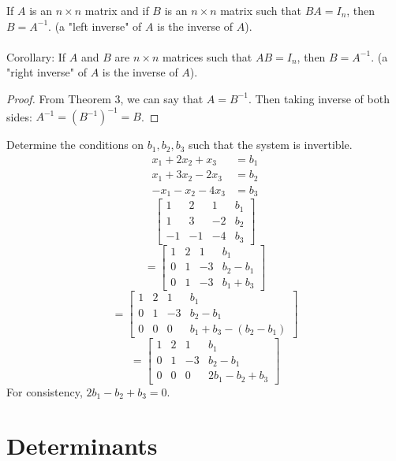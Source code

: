 \documentclass[12pt]{article}
\begin{document}
  \begin{theorem} If $A$ is an $n \times n$ matrix and if $B$ is an $n \times n$ matrix such that $BA = I_n$, then $B = A^{-1}$. (a "left inverse" of $A$ is the inverse of $A$). \\~\\ Corollary: If $A$ and $B$ are $n \times n$ matrices such that $AB = I_n$, then $B = A^{-1}$. (a "right inverse" of $A$ is the inverse of $A$). \end{theorem}
  \begin{proof} From Theorem 3, we can say that $A = B^{-1}$. Then taking inverse of both sides: $A^{-1} = (B^{-1})^{-1} = B$. \end{proof} 
  \begin{example} Determine the conditions on $b_1, b_2, b_3$ such that the system is invertible. 
  $$\begin{aligned} x_1 + 2x_2 + x_3 &= b_1 \\ x_1 + 3x_2 - 2x_3 &= b_2 \\ -x_1 - x_2 - 4x_3 &= b_3 \end{aligned} $$ 
  $$ \begin{bmatrix} 1 & 2 & 1 & b_1 \\ 1 & 3 & -2 & b_2 \\ -1 & -1 & -4 & b_3 \end{bmatrix} $$ $$ =  \begin{bmatrix} 1 & 2 & 1 & b_1 \\ 0 & 1 & -3 & b_2 - b_1 \\ 0 & 1 & -3 & b_1 + b_3 \end{bmatrix} $$ $$ =  \begin{bmatrix} 1 & 2 & 1 & b_1 \\ 0 & 1 & -3 & b_2 - b_1 \\ 0 & 0 & 0 & b_1 + b_3 - (b_2 - b_1) \end{bmatrix} $$ $$ =  \begin{bmatrix} 1 & 2 & 1 & b_1 \\ 0 & 1 & -3 & b_2 - b_1 \\ 0 & 0 & 0 & 2b_1 - b_2 + b_3 \end{bmatrix} $$ 
  For consistency, $ 2b_1 - b_2 + b_3 = 0 $. \end{example} 
  
  \section{Determinants}
\end{document}
